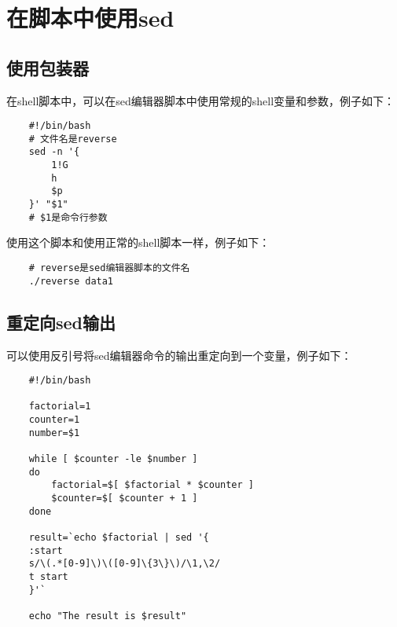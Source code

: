 \documentclass[a4paper,left=2.5cm,right=2.5cm,11pt]{article}
\begin{document}
\section{在脚本中使用sed}
\subsection{使用包装器}
	在shell脚本中，可以在sed编辑器脚本中使用常规的shell变量和参数，例子如下：
	\begin{lstlisting}
	#!/bin/bash
	# 文件名是reverse
	sed -n '{
		1!G
		h
		$p
	}' "$1"
	# $1是命令行参数
	\end{lstlisting}

	使用这个脚本和使用正常的shell脚本一样，例子如下：
	\begin{lstlisting}
	# reverse是sed编辑器脚本的文件名
	./reverse data1
	\end{lstlisting}

\subsection{重定向sed输出}
	可以使用反引号将sed编辑器命令的输出重定向到一个变量，例子如下：
	\begin{lstlisting}
	#!/bin/bash

	factorial=1
	counter=1
	number=$1

	while [ $counter -le $number ]
	do
		factorial=$[ $factorial * $counter ]
		$counter=$[ $counter + 1 ]
	done

	result=`echo $factorial | sed '{
	:start
	s/\(.*[0-9]\)\([0-9]\{3\}\)/\1,\2/
	t start
	}'`

	echo "The result is $result"
	\end{lstlisting}
\end{document}
